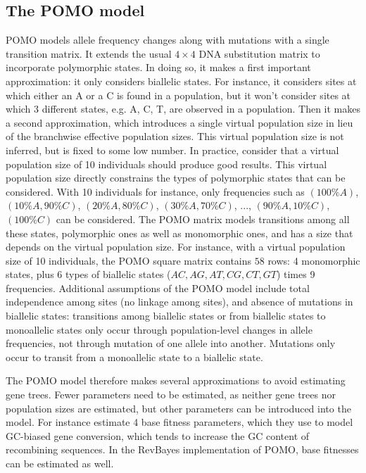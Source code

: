 \documentclass[11pt]{article}
\begin{document}
\subsection*{The POMO model}
POMO models allele frequency changes along with mutations with a single transition matrix.
It extends the usual $4\times4$ DNA substitution matrix to incorporate polymorphic states.
In doing so, it makes a first important approximation: it only considers biallelic states.
For instance, it considers sites at which either an A or a C is found in a population, but it won't consider sites at which 3 different states, e.g. A, C, T, are observed in a population.
Then it makes a second approximation, which introduces a single virtual population size in lieu of the branchwise effective population sizes.
This virtual population size is not inferred, but is fixed to some low number.
In practice, \citet{Demaio} consider that a virtual population size of 10 individuals should produce good results.
This virtual population size directly constrains the types of polymorphic states that can be considered.
With 10 individuals for instance, only frequencies such as $(100\%A)$, $(10\%A, 90\%C)$, $(20\%A, 80\%C)$, $(30\%A, 70\%C)$, ..., $(90\%A, 10\%C)$, $(100\%C)$ can be considered.
The POMO matrix models transitions among all these states, polymorphic ones as well as monomorphic ones, and has a size that depends on the virtual population size.
For instance, with a virtual population size of 10 individuals, the POMO square matrix contains $58$ rows: 4 monomorphic states, plus 6 types of biallelic states ($AC, AG, AT, CG, CT, GT$) times 9 frequencies.
Additional assumptions of the POMO model include total independence among sites (no linkage among sites), and absence of mutations in biallelic states: transitions among biallelic states or from biallelic states to monoallelic states only occur through population-level changes in allele frequencies, not through mutation of one allele into another.
Mutations only occur to transit from a monoallelic state to a biallelic state.

The POMO model therefore makes several approximations to avoid estimating gene trees.
Fewer parameters need to be estimated, as neither gene trees nor population sizes are estimated, but other parameters can be introduced into the model.
For instance \citet{demaio} estimate 4 base fitness parameters, which they use to model GC-biased gene conversion, which tends to increase the GC content of recombining sequences.
In the RevBayes implementation of POMO, base fitnesses can be estimated as well.
\end{document}
